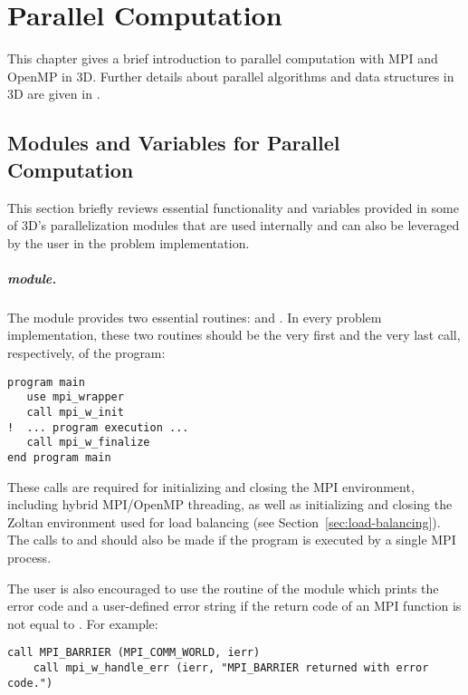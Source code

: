 %
%

\chapter{Parallel Computation}
\label{chap:parallel}


This chapter gives a brief introduction to parallel computation with MPI and OpenMP in \hp3D. Further details about parallel algorithms and data structures in \hp3D are given in \cite{hpbook3}.

\section{Modules and Variables for Parallel Computation}
\label{sec:mpi-modules}

This section briefly reviews essential functionality and variables provided in some of \hp3D's parallelization modules that are used internally and can also be leveraged by the user in the problem implementation.

\paragraph{ module.}
The  module provides two essential routines:  and . In every problem implementation, these two routines should be the very first and the very last call, respectively, of the program:
\begin{lstlisting}[caption=Initiating and finalizing \hp3D's MPI environment., label={lst:mpi_w_init}]
program main
   use mpi_wrapper 
   call mpi_w_init
!  ... program execution ...
   call mpi_w_finalize
end program main
\end{lstlisting}
These calls are required for initializing and closing the MPI environment, including hybrid MPI/OpenMP threading, as well as initializing and closing the Zoltan environment used for load balancing (see Section~\ref{sec:load-balancing}). The calls to  and  should also be made if the program is executed by a single MPI process. 

The user is also encouraged to use the  routine of the  module which prints the error code and a user-defined error string  if the return code  of an MPI function is not equal to . For example:
\begin{lstlisting}[caption=Checking and printing MPI error codes., label={lst:mpi_w_handle_error}]
	call MPI_BARRIER (MPI_COMM_WORLD, ierr)
	call mpi_w_handle_err (ierr, "MPI_BARRIER returned with error code.")
\end{lstlisting}

